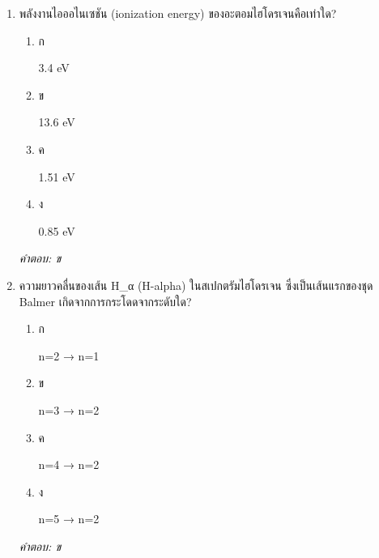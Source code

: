 \documentclass[12pt]{article}
\begin{document}
\begin{enumerate}[label=\arabic*., itemsep=0.5\baselineskip, topsep=0.5\baselineskip, leftmargin=*]
\item พลังงานไอออไนเซชัน (ionization energy) ของอะตอมไฮโดรเจนคือเท่าใด?
\begin{enumerate}[label=\alph*)., itemsep=0.3\baselineskip, topsep=0.3\baselineskip]
\item ก\ 
\begin{minipage}[t]{0.9\linewidth}
\raggedright 3.4 eV
\end{minipage}
\item ข\ 
\begin{minipage}[t]{0.9\linewidth}
\raggedright 13.6 eV
\end{minipage}
\item ค\ 
\begin{minipage}[t]{0.9\linewidth}
\raggedright 1.51 eV
\end{minipage}
\item ง\ 
\begin{minipage}[t]{0.9\linewidth}
\raggedright 0.85 eV
\end{minipage}
\end{enumerate}
\vspace{-0.3\baselineskip}
\begin{small}
\textit{คำตอบ: ข}
\end{small}

\item ความยาวคลื่นของเส้น H\_α (H-alpha) ในสเปกตรัมไฮโดรเจน ซึ่งเป็นเส้นแรกของชุด Balmer เกิดจากการกระโดดจากระดับใด?
\begin{enumerate}[label=\alph*)., itemsep=0.3\baselineskip, topsep=0.3\baselineskip]
\item ก\ 
\begin{minipage}[t]{0.9\linewidth}
\raggedright n=2 → n=1
\end{minipage}
\item ข\ 
\begin{minipage}[t]{0.9\linewidth}
\raggedright n=3 → n=2
\end{minipage}
\item ค\ 
\begin{minipage}[t]{0.9\linewidth}
\raggedright n=4 → n=2
\end{minipage}
\item ง\ 
\begin{minipage}[t]{0.9\linewidth}
\raggedright n=5 → n=2
\end{minipage}
\end{enumerate}
\vspace{-0.3\baselineskip}
\begin{small}
\textit{คำตอบ: ข}
\end{small}


\end{enumerate}
\end{document}
